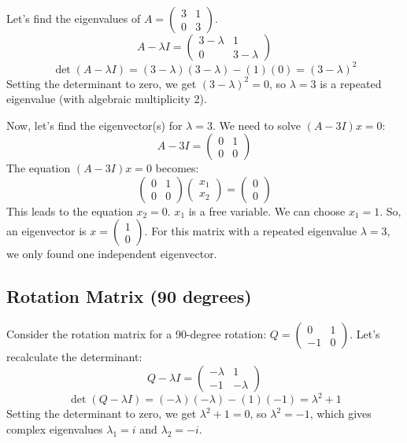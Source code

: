 \documentclass{article}
\begin{document}
Let's find the eigenvalues of $A = \begin{pmatrix} 3 & 1 \\ 0 & 3 \end{pmatrix}$.
\[A - \lambda I = \begin{pmatrix} 3-\lambda & 1 \\ 0 & 3-\lambda \end{pmatrix}\]
\[\det(A - \lambda I) = (3-\lambda)(3-\lambda) - (1)(0) = (3-\lambda)^2\]
Setting the determinant to zero, we get $(3-\lambda)^2 = 0$, so $\lambda = 3$ is a repeated eigenvalue (with algebraic multiplicity 2).

Now, let's find the eigenvector(s) for $\lambda = 3$. We need to solve $(A - 3I)x = 0$:
\[A - 3I = \begin{pmatrix} 0 & 1 \\ 0 & 0 \end{pmatrix}\]
The equation $(A - 3I)x = 0$ becomes:
\[\begin{pmatrix} 0 & 1 \\ 0 & 0 \end{pmatrix} \begin{pmatrix} x_1 \\ x_2 \end{pmatrix} = \begin{pmatrix} 0 \\ 0 \end{pmatrix}\]
This leads to the equation $x_2 = 0$. $x_1$ is a free variable. We can choose $x_1 = 1$. So, an eigenvector is $x = \begin{pmatrix} 1 \\ 0 \end{pmatrix}$.
For this matrix with a repeated eigenvalue $\lambda = 3$, we only found one independent eigenvector.

\subsection{Rotation Matrix (90 degrees)}

Consider the rotation matrix for a 90-degree rotation: $Q = \begin{pmatrix} 0 & 1 \\ -1 & 0 \end{pmatrix}$.
Let's recalculate the determinant:
\[Q - \lambda I = \begin{pmatrix} -\lambda & 1 \\ -1 & -\lambda \end{pmatrix}\]
\[\det(Q - \lambda I) = (-\lambda)(-\lambda) - (1)(-1) = \lambda^2 + 1\]
Setting the determinant to zero, we get $\lambda^2 + 1 = 0$, so $\lambda^2 = -1$, which gives complex eigenvalues $\lambda_1 = i$ and $\lambda_2 = -i$.
\end{document}
